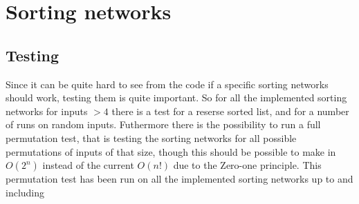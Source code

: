 \section{Sorting networks}

\subsection{Testing}
Since it can be quite hard to see from the code if a specific sorting networks
should work, testing them is quite important. So for all the implemented
sorting networks for inputs $>4$ there is a test for a reserse sorted list, and
for a number of runs on random inputs. Futhermore there is the possibility to
run a full permutation test, that is testing the sorting networks for all
possible permutations of inputs of that size, though this should be possible to
make in $O(2^n)$ instead of the current $O(n!)$ due to the Zero-one principle.
This permutation test has been run on all the implemented sorting networks up
to and including 
